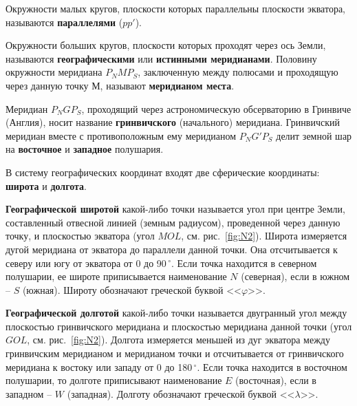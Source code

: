 \documentclass[a4paper, 12pt, twoside, final, book, russian, fittopage, cyremdash]{ncc}
\newcommand{\gr}{\ensuremath{\,^\circ}\xspace}
\newcommand{\ris}[1]{\ref{fig:#1}}
\begin{document}
Окружности малых кругов, плоскости которых параллельны плоскости экватора, называются \textbf{параллелями} ($pp'$). 

Окружности больших кругов, плоскости которых проходят через ось Земли, называются \textbf{географическими} или \textbf{истинными меридианами}. Половину окружности меридиана $P_NMP_S$, заключенную между полюсами и проходящую через данную точку $М$, называют \textbf{меридианом места}.

 Меридиан $P_NGP_S$, проходящий через астрономическую обсерваторию в Гринвиче (Англия), носит название \textbf{гринвичского} (начального) меридиана. Гринвичский меридиан вместе с противоположным ему меридианом $P_NG'P_S$ делит земной шар на \textbf{восточное} и \textbf{западное} полушария. 

В систему географических координат входят две сферические координаты: \textbf{широта} и \textbf{долгота}.

\textbf{Географической широтой} какой-либо точки называется угол при центре Земли, составленный отвесной линией (земным радиусом), проведенной через данную точку, и плоскостью экватора (угол $MOL$, см. рис.~\ris{N2}). Широта измеряется дугой меридиана от экватора до параллели данной точки. Она отсчитывается к северу или югу от экватора от 0 до 90\gr. Если точка находится в северном полушарии, ее широте приписывается наименование $N$ (северная), если в южном \--- $S$ (южная). Широту обозначают греческой буквой <<$\varphi$>>. 

\textbf{Географической долготой} какой-либо точки называется двугранный угол между плоскостью гринвичского меридиана и плоскостью меридиана данной точки (угол $GOL$, см. рис.~\ris{N2}). Долгота измеряется меньшей из дуг экватора между гринвичским меридианом и меридианом точки и отсчитывается от гринвичского меридиана к востоку или западу от 0 до 180\gr. Если точка находится в восточном полушарии, то долготе приписывают наименование $E$ (восточная), если в западном \--- $W$ (западная). Долготу обозначают греческой буквой <<$\lambda$>>.
\end{document}
